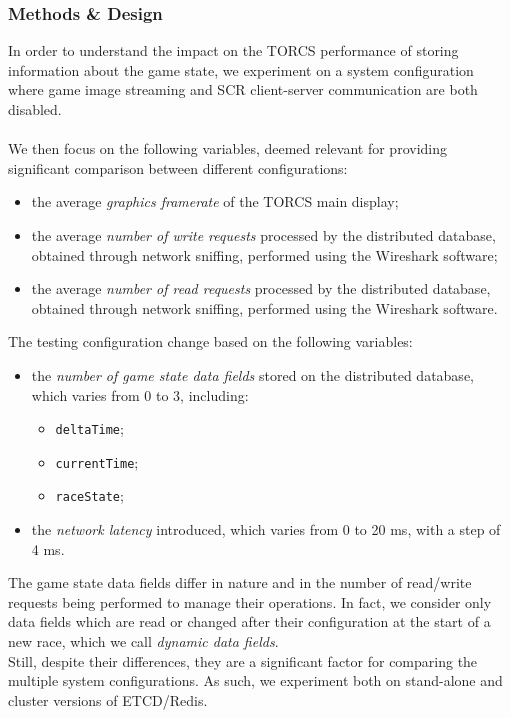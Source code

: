 \subsubsection{Methods \& Design}
In order to understand the impact on the TORCS performance of storing information about the game state, we experiment on a system configuration where game image streaming and SCR client-server communication are both disabled. \\ \\
We then focus on the following variables, deemed relevant for providing significant comparison between different configurations:
\begin{itemize}
	\item the average \textit{graphics framerate} of the TORCS main display;
	\item the average \textit{number of write requests} processed by the distributed database, obtained through network sniffing, performed using the Wireshark software;
	\item the average \textit{number of read requests} processed by the distributed database, obtained through network sniffing, performed using the Wireshark software.
\end{itemize}
The testing configuration change based on the following variables:
\begin{itemize}
	\item the \textit{number of game state data fields} stored on the distributed database, which varies from 0 to 3, including:
	\begin{itemize}
		\item \texttt{deltaTime};
		\item \texttt{currentTime};
		\item \texttt{raceState};
	\end{itemize}
	\item the \textit{network latency} introduced, which varies from 0 to 20 ms, with a step of 4 ms.
\end{itemize}
The game state data fields differ in nature and in the number of read/write requests being performed to manage their operations. In fact, we consider only data fields which are read or changed after their configuration at the start of a new race, which we call \textit{ dynamic data fields}. \\ 
Still, despite their differences, they are a significant factor for comparing the multiple system configurations. As such, we experiment both on stand-alone and cluster versions of ETCD/Redis.


